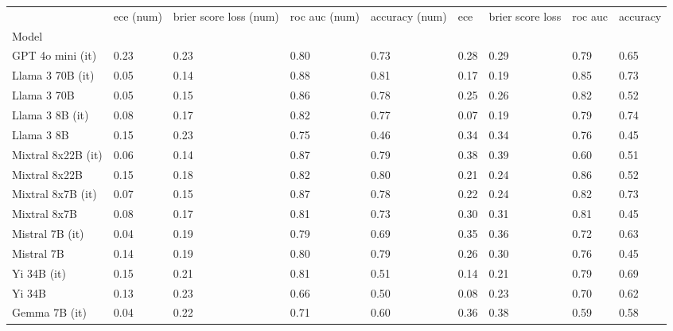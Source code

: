 \begin{tabular}{lllllllll}
\toprule
 & ece (num) & brier score loss (num) & roc auc (num) & accuracy (num) & ece & brier score loss & roc auc & accuracy \\
Model &  &  &  &  &  &  &  &  \\
\midrule
GPT 4o mini (it) & 0.23 & 0.23 & 0.80 & 0.73 & 0.28 & 0.29 & 0.79 & 0.65 \\
Llama 3 70B (it) & \cellcolor{cyan!0.7} 0.05 & \cellcolor{cyan!25.0} 0.14 & \cellcolor{cyan!25.0} 0.88 & \cellcolor{cyan!25.0} 0.81 & 0.17 & \cellcolor{cyan!17.1} 0.19 & \cellcolor{cyan!23.3} 0.85 & \cellcolor{cyan!15.4} 0.73 \\
Llama 3 70B & 0.05 & \cellcolor{cyan!16.7} 0.15 & \cellcolor{cyan!13.6} 0.86 & \cellcolor{cyan!5.8} 0.78 & 0.25 & 0.26 & \cellcolor{cyan!2.3} 0.82 & 0.52 \\
Llama 3 8B (it) & 0.08 & 0.17 & 0.82 & 0.77 & 0.07 & \cellcolor{cyan!25.0} 0.19 & 0.79 & \cellcolor{cyan!25.0} 0.74 \\
Llama 3 8B & 0.15 & 0.23 & 0.75 & \cellcolor{orange!25.0} 0.46 & 0.34 & 0.34 & 0.76 & \cellcolor{orange!25.0} 0.45 \\
Mixtral 8x22B (it) & 0.06 & \cellcolor{cyan!21.9} 0.14 & \cellcolor{cyan!24.4} 0.87 & \cellcolor{cyan!16.5} 0.79 & \cellcolor{orange!23.0} 0.38 & \cellcolor{orange!8.0} 0.39 & 0.60 & 0.51 \\
Mixtral 8x22B & 0.15 & 0.18 & 0.82 & \cellcolor{cyan!20.7} 0.80 & 0.21 & 0.24 & \cellcolor{cyan!25.0} 0.86 & 0.52 \\
Mixtral 8x7B (it) & 0.07 & \cellcolor{cyan!16.7} 0.15 & \cellcolor{cyan!23.2} 0.87 & \cellcolor{cyan!7.2} 0.78 & 0.22 & 0.24 & \cellcolor{cyan!6.8} 0.82 & \cellcolor{cyan!13.7} 0.73 \\
Mixtral 8x7B & 0.08 & 0.17 & 0.81 & 0.73 & 0.30 & 0.31 & \cellcolor{cyan!1.1} 0.81 & \cellcolor{orange!24.1} 0.45 \\
Mistral 7B (it) & \cellcolor{cyan!7.4} 0.04 & 0.19 & 0.79 & 0.69 & \cellcolor{orange!6.6} 0.35 & 0.36 & 0.72 & 0.63 \\
Mistral 7B & 0.14 & 0.19 & 0.80 & \cellcolor{cyan!12.9} 0.79 & 0.26 & 0.30 & 0.76 & \cellcolor{orange!25.0} 0.45 \\
Yi 34B (it) & 0.15 & 0.21 & 0.81 & 0.51 & 0.14 & 0.21 & 0.79 & 0.69 \\
Yi 34B & 0.13 & 0.23 & 0.66 & 0.50 & 0.08 & 0.23 & 0.70 & 0.62 \\
Gemma 7B (it) & \cellcolor{cyan!8.8} 0.04 & 0.22 & 0.71 & 0.60 & \cellcolor{orange!10.0} 0.36 & 0.38 & 0.59 & 0.58 \\

\end{tabular}
